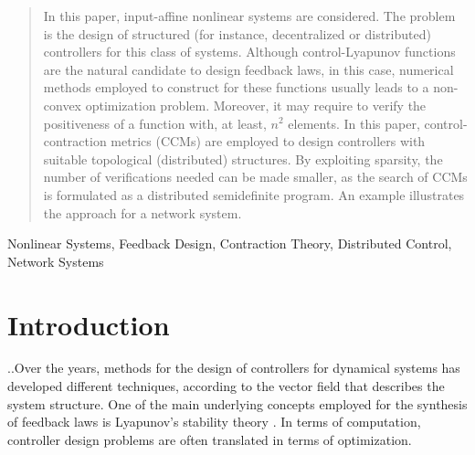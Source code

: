 \documentclass[10pt,twocolumn,twoside]{IEEEtran}
\newcounter{para}
\newcommand\mypara{\par \thesection.\refstepcounter{para}\thepara.\space}
\theoremstyle{plain}
\theoremstyle{definition}
\theoremstyle{remark}
\begin{document}
\maketitle

\begin{abstract}
In this paper, input-affine nonlinear systems are considered. The problem is the design of structured (for instance, decentralized or distributed) controllers for this class of systems. Although control-Lyapunov functions are the natural candidate to design feedback laws, in this case, numerical methods employed to construct for these functions usually leads to a non-convex optimization problem. Moreover, it may require to verify the positiveness of a function with, at least, $n^2$ elements. In this paper, control-contraction metrics (CCMs) are employed to design controllers with suitable topological (distributed) structures. By exploiting sparsity, the number of verifications needed can be made smaller, as the search of CCMs is formulated as a distributed semidefinite program. An example illustrates the approach for a network system.
\end{abstract}

\begin{IEEEkeywords}
Nonlinear Systems, Feedback Design, Contraction Theory, Distributed Control, Network Systems
\end{IEEEkeywords}






%
\IEEEpeerreviewmaketitle



\section{Introduction}

\mypara Over the years, methods for the design of controllers for dynamical systems has developed different techniques, according to the vector field that describes the system structure. One of the main underlying concepts employed for the synthesis of feedback laws is Lyapunov's stability theory \cite{Bhatia1970,Rouche:1977}. In terms of computation, controller design problems are often translated in terms of optimization.
\end{document}
